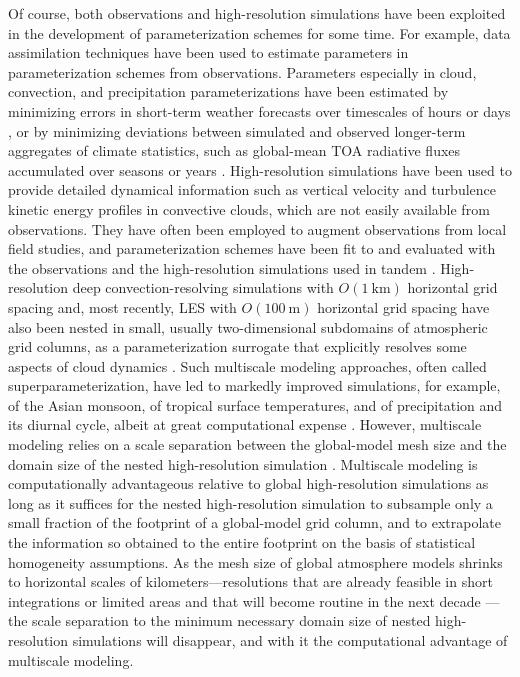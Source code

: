 \documentclass[draft]{agujournal}
\begin{document}
Of course, both observations and high-resolution simulations have been exploited in the development of parameterization schemes for some time. For example, data assimilation techniques have been used to estimate parameters in parameterization schemes from observations. Parameters especially in cloud, convection, and precipitation parameterizations have been estimated by minimizing errors in short-term weather forecasts over timescales of hours or days \citep[e.g.,][]{Emanuel99a,Grell02a,Aksoy06a,Schirber13a,Ruiz13a,Ruiz15a}, or by minimizing deviations between simulated and observed longer-term aggregates of climate statistics, such as global-mean TOA radiative fluxes accumulated over seasons or years \citep[e.g.,][]{Jackson08a,Jarvinen10a,Neelin10a,Solonen12a,Tett13a}. High-resolution simulations have been used to provide detailed dynamical information such as vertical velocity and turbulence kinetic energy profiles in convective clouds, which are not easily available from observations. They have often been employed to augment observations from local field studies, and parameterization schemes have been fit to and evaluated with the observations and the high-resolution simulations used in tandem \citep[e.g.,][]{Liu01a,Siebesma03,Stevens05a,Siebesma07,Hohenegger11a,de-Rooy13a,Romps16a}. High-resolution deep convection-resolving simulations with $O(1~\mathrm{km})$ horizontal grid spacing and, most recently, LES with $O(100~\mathrm{m})$ horizontal grid spacing have also been nested in small, usually two-dimensional subdomains of atmospheric grid columns, as a parameterization surrogate that explicitly resolves some aspects of cloud dynamics \citep[e.g.,][]{Grabowski99a,Grabowski01a,Khairoutdinov01a,Randall03a,Khairoutdinov05a,Randall13b,Grabowski16a,Parishani17a}. Such multiscale modeling approaches, often called superparameterization, have led to markedly improved simulations, for example, of the Asian monsoon, of tropical surface temperatures, and of precipitation and its diurnal cycle, albeit at great computational expense \citep[e.g.,][]{Benedict09a,Pritchard09a,Pritchard09b,Stan10a,DeMott13a}. However, multiscale modeling relies on a scale separation between the global-model mesh size and the domain size of the nested high-resolution simulation \citep{E07a}. Multiscale modeling is computationally advantageous relative to global high-resolution simulations as long as it suffices for the nested high-resolution simulation to subsample only a small fraction of the footprint of a global-model grid column, and to extrapolate the information so obtained to the entire footprint on the basis of statistical homogeneity assumptions. As the mesh size of global atmosphere models shrinks to horizontal scales of kilometers---resolutions that are already feasible in short integrations or limited areas and that will become routine in the next decade \citep{Palmer14c,Ban15a,Ohno16a,Schneider17a}---the scale separation to the minimum necessary domain size of nested high-resolution simulations will disappear, and with it the computational advantage of multiscale modeling.
\end{document}
